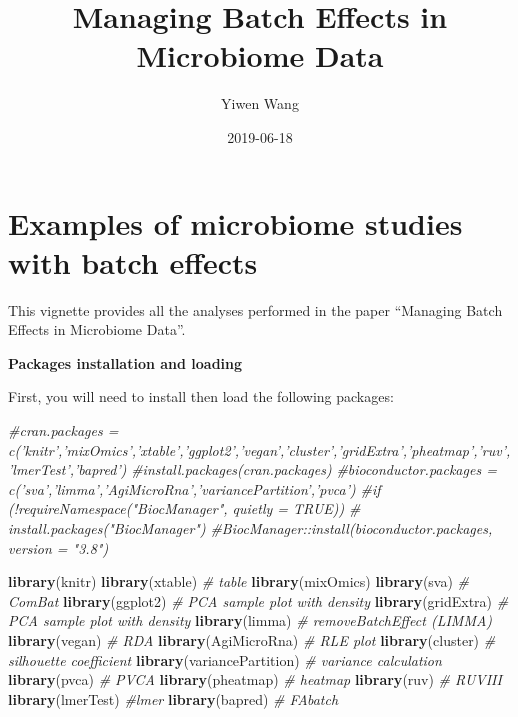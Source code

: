 \documentclass[]{book}
\title{Managing Batch Effects in Microbiome Data}
\author{Yiwen Wang}
\date{2019-06-18}
\newenvironment{Shaded}{\begin{snugshade}}{\end{snugshade}}
\newcommand{\KeywordTok}[1]{\textcolor[rgb]{0.13,0.29,0.53}{\textbf{#1}}}
\newcommand{\CommentTok}[1]{\textcolor[rgb]{0.56,0.35,0.01}{\textit{#1}}}
\newcommand{\NormalTok}[1]{#1}
\begin{document}
\maketitle

{
\setcounter{tocdepth}{3}
\tableofcontents
}
\chapter{Examples of microbiome studies with batch
effects}\label{examples-of-microbiome-studies-with-batch-effects}

This vignette provides all the analyses performed in the paper
``Managing Batch Effects in Microbiome Data''.

\textbf{Packages installation and loading}

First, you will need to install then load the following packages:

\begin{Shaded}
\begin{Highlighting}[]
\CommentTok{#cran.packages = c('knitr','mixOmics','xtable','ggplot2','vegan','cluster','gridExtra','pheatmap','ruv','lmerTest','bapred')}
\CommentTok{#install.packages(cran.packages)}
\CommentTok{#bioconductor.packages = c('sva','limma','AgiMicroRna','variancePartition','pvca')}
\CommentTok{#if (!requireNamespace("BiocManager", quietly = TRUE))}
\CommentTok{#    install.packages("BiocManager")}
\CommentTok{#BiocManager::install(bioconductor.packages, version = "3.8")}

\KeywordTok{library}\NormalTok{(knitr)}
\KeywordTok{library}\NormalTok{(xtable) }\CommentTok{# table}
\KeywordTok{library}\NormalTok{(mixOmics)}
\KeywordTok{library}\NormalTok{(sva) }\CommentTok{# ComBat}
\KeywordTok{library}\NormalTok{(ggplot2) }\CommentTok{# PCA sample plot with density}
\KeywordTok{library}\NormalTok{(gridExtra) }\CommentTok{# PCA sample plot with density}
\KeywordTok{library}\NormalTok{(limma) }\CommentTok{# removeBatchEffect (LIMMA)}
\KeywordTok{library}\NormalTok{(vegan) }\CommentTok{# RDA}
\KeywordTok{library}\NormalTok{(AgiMicroRna) }\CommentTok{# RLE plot}
\KeywordTok{library}\NormalTok{(cluster) }\CommentTok{# silhouette coefficient}
\KeywordTok{library}\NormalTok{(variancePartition) }\CommentTok{# variance calculation}
\KeywordTok{library}\NormalTok{(pvca) }\CommentTok{# PVCA}
\KeywordTok{library}\NormalTok{(pheatmap) }\CommentTok{# heatmap}
\KeywordTok{library}\NormalTok{(ruv) }\CommentTok{# RUVIII}
\KeywordTok{library}\NormalTok{(lmerTest) }\CommentTok{#lmer}
\KeywordTok{library}\NormalTok{(bapred) }\CommentTok{# FAbatch}
\end{Highlighting}
\end{Shaded}
\end{document}
